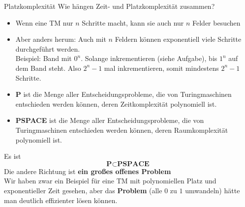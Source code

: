 \begin{frame}{Platzkomplexität}
	Wie hängen Zeit- und Platzkomplexität zusammen?
	\begin{itemize}
		\item Wenn eine TM nur $n$ Schritte macht, kann sie auch nur $n$ Felder besuchen
		\item Aber anders herum: Auch mit $n$ Feldern können exponentiell viele Schritte durchgeführt werden.\\
			  Beispiel: Band mit $0^n$. Solange inkrementieren (siehe Aufgabe), bis $1^n$ auf dem Band steht. \pause Also $2^n - 1$ mal inkrementieren, somit mindestens $2^n - 1$ Schritte.
	\end{itemize}
\end{frame}

\begin{frame}
	\begin{Definition}
	\begin{itemize}
		\item \textbf{P} ist die Menge aller Entscheidungsprobleme, die von Turingmaschinen entschieden werden können, deren Zeitkomplexität polynomiell ist.
		\item \textbf{PSPACE} ist die Menge aller Entscheidungsprobleme, die von Turingmaschinen entschieden werden können, deren Raumkomplexität polynomiell ist.
	\end{itemize}
	\end{Definition}
	\pause
	Es ist $$\textbf{P} \subset \textbf{PSPACE}$$ \pause
	Die andere Richtung ist \textbf{ein großes offenes Problem}\\
	Wir haben zwar ein Beispiel für eine TM mit polynomiellen Platz und exponentieller Zeit gesehen, aber das \textbf{Problem} (alle $0$ zu $1$ umwandeln) hätte man deutlich effizienter lösen können.
\end{frame}

